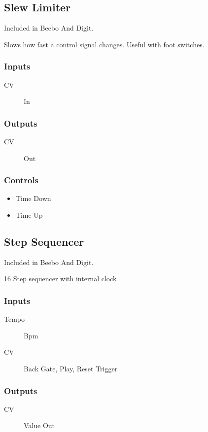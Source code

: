 \subsection{Slew Limiter}

Included in Beebo And Digit.

Slows how fast a control signal changes. Useful with foot switches.



\subsubsection{Inputs}
\begin{description}
\item [CV] In
\end{description}

\subsubsection{Outputs}
\begin{description}
\item [CV] Out
\end{description}

\subsubsection{Controls}
\begin{itemize}
\item Time Down
\item Time Up
\end{itemize}

\subsection{Step Sequencer}

Included in Beebo And Digit.

16 Step sequencer with internal clock



\subsubsection{Inputs}
\begin{description}
\item [Tempo] Bpm
\item [CV] Back Gate, Play, Reset Trigger
\end{description}

\subsubsection{Outputs}
\begin{description}
\item [CV] Value Out
\end{description}


